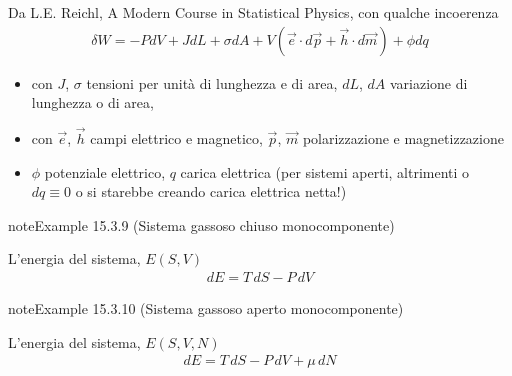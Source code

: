 \documentclass[letterpaper,10pt,italian]{jupyterBook}
\begin{document}
\sphinxAtStartPar
Da L.E. Reichl, A Modern Course in Statistical Physics, con qualche incoerenza  
\begin{equation*}
\begin{split}\delta W = - P dV + J dL + \sigma d A + V \left( \vec{e} \cdot d \vec{p} + \vec{h} \cdot d \vec{m}\right) + \phi d q \end{split}
\end{equation*}\begin{itemize}
\item {} 
\sphinxAtStartPar
con \(J\), \(\sigma\) tensioni per unità di lunghezza e di area, \(d L \), \(d A\) variazione di lunghezza o di area,

\item {} 
\sphinxAtStartPar
con \(\vec{e}\), \(\vec{h}\) campi elettrico e magnetico, \(\vec{p}\), \(\vec{m}\) polarizzazione e magnetizzazione

\item {} 
\sphinxAtStartPar
\(\phi\) potenziale elettrico, \(q\) carica elettrica (per sistemi aperti, altrimenti o \(dq \equiv 0\) o si starebbe creando carica elettrica netta!)

\end{itemize}
\label{ch/thermodynamics/principles-gibbs-phase-rule:example-12}
\begin{sphinxadmonition}{note}{Example 15.3.9 (Sistema gassoso chiuso monocomponente)}



\sphinxAtStartPar
L’energia del sistema, \(E(S,V)\)
\begin{equation*}
\begin{split}dE = T \, dS - P \, dV\end{split}
\end{equation*}\end{sphinxadmonition}
\label{ch/thermodynamics/principles-gibbs-phase-rule:example-13}
\begin{sphinxadmonition}{note}{Example 15.3.10 (Sistema gassoso aperto monocomponente)}



\sphinxAtStartPar
L’energia del sistema, \(E(S,V,N)\)
\begin{equation*}
\begin{split}dE = T \, dS - P \, dV + \mu \, dN\end{split}
\end{equation*}\end{sphinxadmonition}
\label{ch/thermodynamics/principles-gibbs-phase-rule:example-14}
\end{document}
